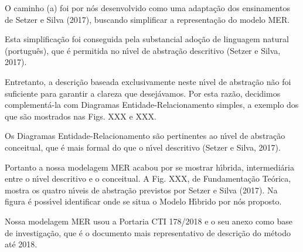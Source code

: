 \documentclass[
12pt,		%
openright,	%
twoside,  %
a4paper,			%
chapter=TITLE,		%
english,			%
french,				%
spanish,			%
brazil				%
]{USPSC-classe/USPSC}
\begin{document}
O caminho (a) foi por n\'os desenvolvido como uma adapta\c{c}\~ao dos ensinamentos de  Setzer e Silva (2017), buscando simplificar a representa\c{c}\~ao do modelo MER.










Esta simplifica\c{c}\~ao foi conseguida pela substancial ado\c{c}\~ao de linguagem natural (portugu\^es), que \'e permitida no n\'{\i}vel de abstra\c{c}\~ao descritivo (Setzer e Silva, 2017).










Entretanto, a descri\c{c}\~ao baseada exclusivamente neste n\'{\i}vel de abstra\c{c}\~ao n\~ao foi suficiente para garantir a clareza que desej\'avamos. Por esta raz\~ao, decidimos complement\'a-la com Diagramas Entidade-Relacionamento simples, a exemplo dos que s\~ao mostrados nas Figs. XXX e XXX.










Os Diagramas Entidade-Relacionamento s\~ao pertinentes ao n\'{\i}vel de abstra\c{c}\~ao conceitual, que \'e mais formal do que o n\'{\i}vel descritivo (Setzer e Silva, 2017).










Portanto a nossa modelagem MER acabou por se mostrar h\'{\i}brida, intermedi\'aria entre o n\'{\i}vel descritivo e o conceitual. A Fig. XXX, de Fundamenta\c{c}\~ao Te\'orica, mostra os quatro n\'{\i}veis de abstra\c{c}\~ao previstos por  Setzer e Silva (2017). Na figura \'e poss\'{\i}vel identificar onde se situa o Modelo H\'{\i}brido por n\'os proposto.










Nossa modelagem MER usou a Portaria CTI 178/2018 e o seu anexo como base de investiga\c{c}\~ao, que \'e o documento mais representativo de descri\c{c}\~ao do m\'etodo at\'e 2018.
\end{document}
